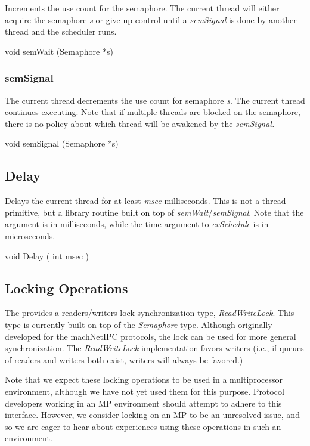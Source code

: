 Increments the use count for the semaphore.  The current thread will
either acquire the semaphore {\em s} or give up control until a {\em
semSignal} is done by another thread and the scheduler runs.
\medskip

{\sem void} {\bold semWait} ({\sem Semaphore}  *{\caps s})\\

\subsubsection{semSignal}

The current thread decrements the use count for semaphore {\em s}.
The current thread continues executing.  Note that if multiple threads
are blocked on the semaphore, there is no policy about which thread
will be awakened by the {\em semSignal.}
\medskip

{\sem void} {\bold semSignal} ({\sem Semaphore}  *{\caps s})


\subsection{Delay}

Delays the current thread for at least {\em msec} milliseconds.  
This is not a thread primitive, but a library routine built on top of
{\em semWait}/{\em semSignal}.
Note that the argument is in milliseconds, while the time argument to {\em
evSchedule} is in microseconds.
\medskip

{\sem void} {\bold Delay} ( {\sem int} {\caps} msec )


\subsection{Locking Operations}

The \xk{} provides a readers/writers lock synchronization type, {\em
ReadWriteLock}.  This type is currently built on top of the \xk{} {\em
Semaphore} type.  Although originally developed for the machNetIPC
protocols, the lock can be used for more general synchronization.  The
{\em ReadWriteLock} implementation favors writers (i.e., if queues of
readers and writers both exist, writers will always be favored.)

Note that we expect these locking operations to be used in a
multiprocessor environment, although we have not yet used them for
this purpose. Protocol developers working in an MP environment should
attempt to adhere to this interface. However, we consider locking on
an MP to be an unresolved issue, and so we are eager to hear about
experiences using these operations in such an environment.

